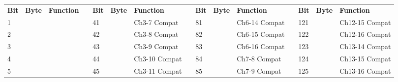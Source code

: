 \documentclass[]{article}
\begin{document}
\begin{landscape}	
	\begin{table}[]		
		\footnotesize
		\begin{tabular}{lllllllllllllll}
			\cline{1-3} \cline{5-7} \cline{9-11} \cline{13-15}
			\textbf{Bit} & \textbf{Byte}       & \textbf{Function}              &                    & \textbf{Bit} & \textbf{Byte}        & \textbf{Function} &  & \textbf{Bit} & \textbf{Byte}        & \textbf{Function} &  & \textbf{Bit}                                                                                    & \textbf{Byte}                                & \textbf{Function}                                  \\ \cline{1-3} \cline{5-7} \cline{9-11} \cline{13-15} 
			1            &                     &                                &                    & 41           &                      & Ch3-7  Compat     &  & 81           &                      & Ch6-14  Compat    &  & 121                                                                                             &                                              & Ch12-15  Compat                                    \\
			2            &                     &                                &                    & 42           &                      & Ch3-8  Compat     &  & 82           &                      & Ch6-15  Compat    &  & 122                                                                                             &                                              & Ch12-16  Compat                                    \\
			3            &                     &                                &                    & 43           &                      & Ch3-9  Compat     &  & 83           &                      & Ch6-16  Compat    &  & 123                                                                                             &                                              & Ch13-14  Compat                                    \\
			4            &                     &                                &                    & 44           &                      & Ch3-10  Compat    &  & 84           &                      & Ch7-8  Compat     &  & 124                                                                                             &                                              & Ch13-15  Compat                                    \\
			5            &                     &                                &                    & 45           &                      & Ch3-11  Compat    &  & 85           &                      & Ch7-9  Compat     &  & 125                                                                                             &                                              & Ch13-16  Compat                                    \\

\end{tabular}
\end{table}
\end{landscape}
\end{document}
